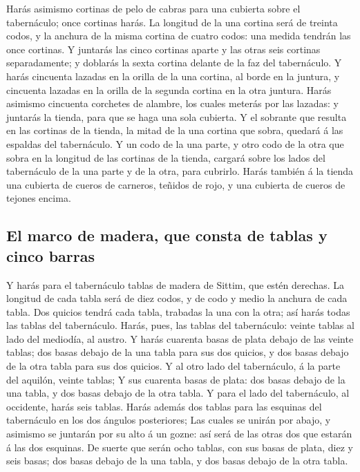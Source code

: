  Harás asimismo cortinas de pelo de cabras para una cubierta
sobre el tabernáculo; once cortinas harás.  La longitud de
la una cortina será de treinta codos, y la anchura de la misma cortina
de cuatro codos: una medida tendrán las once cortinas.  Y
juntarás las cinco cortinas aparte y las otras seis cortinas
separadamente; y doblarás la sexta cortina delante de la faz del
tabernáculo.  Y harás cincuenta lazadas en la orilla de la
una cortina, al borde en la juntura, y cincuenta lazadas en la orilla de
la segunda cortina en la otra juntura.  Harás asimismo
cincuenta corchetes de alambre, los cuales meterás por las lazadas: y
juntarás la tienda, para que se haga una sola cubierta.  Y
el sobrante que resulta en las cortinas de la tienda, la mitad de la una
cortina que sobra, quedará á las espaldas del tabernáculo. 
Y un codo de la una parte, y otro codo de la otra que sobra en la
longitud de las cortinas de la tienda, cargará sobre los lados del
tabernáculo de la una parte y de la otra, para cubrirlo. 
Harás también á la tienda una cubierta de cueros de carneros, teñidos de
rojo, y una cubierta de cueros de tejones encima.

\hypertarget{el-marco-de-madera-que-consta-de-tablas-y-cinco-barras}{%
\subsection{El marco de madera, que consta de tablas y cinco
barras}\label{el-marco-de-madera-que-consta-de-tablas-y-cinco-barras}}

 Y harás para el tabernáculo tablas de madera de Sittim,
que estén derechas.  La longitud de cada tabla será de diez
codos, y de codo y medio la anchura de cada tabla.  Dos
quicios tendrá cada tabla, trabadas la una con la otra; así harás todas
las tablas del tabernáculo.  Harás, pues, las tablas del
tabernáculo: veinte tablas al lado del mediodía, al austro.
 Y harás cuarenta basas de plata debajo de las veinte
tablas; dos basas debajo de la una tabla para sus dos quicios, y dos
basas debajo de la otra tabla para sus dos quicios.  Y al
otro lado del tabernáculo, á la parte del aquilón, veinte tablas;
 Y sus cuarenta basas de plata: dos basas debajo de la una
tabla, y dos basas debajo de la otra tabla.  Y para el lado
del tabernáculo, al occidente, harás seis tablas.  Harás
además dos tablas para las esquinas del tabernáculo en los dos ángulos
posteriores;  Las cuales se unirán por abajo, y asimismo se
juntarán por su alto á un gozne: así será de las otras dos que estarán á
las dos esquinas.  De suerte que serán ocho tablas, con sus
basas de plata, diez y seis basas; dos basas debajo de la una tabla, y
dos basas debajo de la otra tabla.

